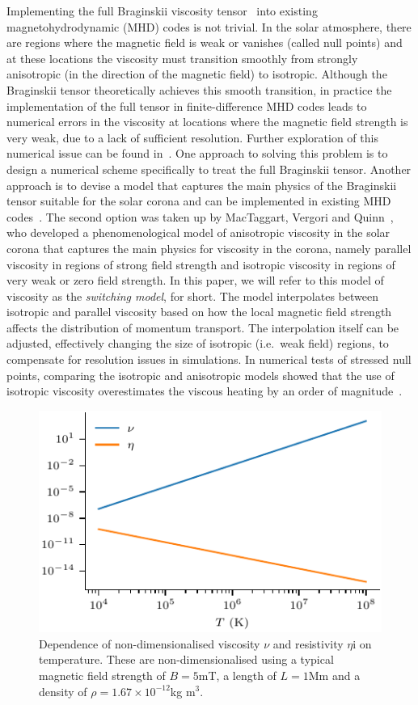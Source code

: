 Implementing the full Braginskii viscosity
tensor~\cite{braginskiiTransportProcessesPlasma1965} into existing
magnetohydrodynamic (MHD) codes is not trivial. In the solar
atmosphere, there are regions where the magnetic field is weak or
vanishes (called null points) and at these locations the viscosity must
transition smoothly from strongly anisotropic (in the direction of the
magnetic field) to isotropic. Although the Braginskii tensor theoretically achieves
this smooth transition, in practice the implementation
of the full tensor in finite-difference MHD codes leads to numerical
errors in the viscosity at locations where the magnetic field strength
is very weak, due to a lack of sufficient resolution. Further
exploration of this numerical issue can be found
in~\cite{mactaggartBraginskiiMagnetohydrodynamicsArbitrary2017}. One
approach to solving this problem is to design a numerical scheme
specifically to treat the full Braginskii tensor. Another approach is
to devise a model that captures the main physics of the Braginskii
tensor suitable for the solar corona and can be implemented in
existing MHD codes~\cite{hollwegViscosityMagnetizedPlasma1985}. The
second option was taken up by MacTaggart, Vergori and
Quinn~\cite{mactaggartBraginskiiMagnetohydrodynamicsArbitrary2017},
who developed a phenomenological model of anisotropic viscosity in the
solar corona that captures the main physics for viscosity in the
corona, namely parallel viscosity in regions of strong field strength and isotropic viscosity in regions of very weak or zero field strength. In this paper, we will refer to this model of viscosity as the \textit{switching model}, for short. The model interpolates between isotropic and parallel viscosity based on how the local magnetic field strength affects the distribution of momentum transport. The interpolation itself can be adjusted, effectively changing the size of isotropic (i.e.\ weak field) regions, to compensate for resolution issues in simulations. In numerical tests of stressed null points, comparing the isotropic and anisotropic models showed that the use of isotropic viscosity overestimates the viscous heating by an order of magnitude~\cite{mactaggartBraginskiiMagnetohydrodynamicsArbitrary2017}.

\begin{figure}[t]
  \centering
  \includegraphics[width=0.5\linewidth]{visc_dep_on_temp.pdf}
  \caption{Dependence of non-dimensionalised viscosity $\nu$ and resistivity $\eta$i on temperature. These are non-dimensionalised using a typical magnetic field strength of $B = 5$mT, a length of $L = 1$Mm and a density of $\rho = 1.67 \times 10^{-12}$kg m$^3$.}
  \label{fig:visc_dep_on_temp}
\end{figure}

